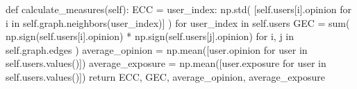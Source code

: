 \begin{codigo}[caption={Simulando redes sociais segundo a modelagem baseada em agentes}, label={codigo:mba}, language=Python, breaklines=true]
  def calculate_measures(self):
    ECC = {
        user_index: np.std(
            [self.users[i].opinion for i in self.graph.neighbors(user_index)]
        )
        for user_index in self.users
    }
    GEC = sum(
        np.sign(self.users[i].opinion) * np.sign(self.users[j].opinion)
        for i, j in self.graph.edges
    )
    average_opinion = np.mean([user.opinion for user in self.users.values()])
    average_exposure = np.mean([user.exposure for user in self.users.values()])
    return ECC, GEC, average_opinion, average_exposure
\end{codigo}